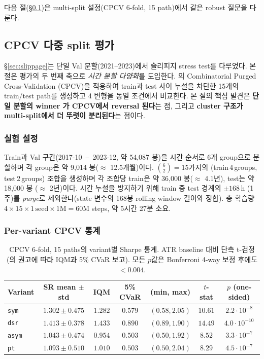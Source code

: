 \documentclass[11pt, a4paper]{article}
\begin{document}
다음 절(\S\ref{sec:cpcv})은 multi-split 설정(CPCV 6-fold, 15 path)에서 같은
robust 질문을 다룬다.

\subsection{CPCV 다중 split 평가}
\label{sec:cpcv}

\S\ref{sec:slippage}는 단일 Val 분할(2021--2023)에서 슬리피지 stress test를
다루었다. 본 절은 평가의 두 번째 축으로 \emph{시간 분할 다양화}를 도입한다.
\citet{lopezdeprado2018advances}의 Combinatorial Purged Cross-Validation
(CPCV)을 적용하여 train과 test 사이 누설을 차단한 15개의 train/test path를
생성하고 4 변형을 동일 조건에서 비교한다. 본 절의 핵심 발견은
\textbf{단일 분할의 winner 가 CPCV에서 reversal 된다}는 점, 그리고
\textbf{cluster 구조가 multi-split에서 더 뚜렷이 분리된다}는 점이다.

\subsubsection{실험 설정}
\label{sec:cpcv_setup}

Train과 Val 구간(2017-10 \,--\, 2023-12, 약 54{,}087 봉)을 시간 순서로 6개
group으로 분할하며 각 group은 약 9{,}014 봉($\approx$ 12.5개월)이다.
$\binom{6}{2} = 15$가지의 (train\,4\,groups, test\,2\,groups) 조합을 생성하며
각 조합당 train은 약 36{,}000 봉($\approx$ 4.1년), test는 약 18{,}000 봉
($\approx$ 2년)이다. 시간 누설을 방지하기 위해 train 중 test 경계의
$\pm 168\,\mathrm{h}$ (1주)를 \emph{purge}로 제외한다(state 변수의 168봉
rolling window 길이와 정합). 총 학습량 $4 \times 15 \times 1\,\mathrm{seed} \times
1\mathrm{M} = 60$M steps, 약 5시간 27분 소요.

\subsubsection{Per-variant CPCV 통계}
\label{sec:cpcv_per_variant}

\begin{table}[!htbp]
\centering
\small
\caption{CPCV 6-fold, 15 paths의 variant별 Sharpe 통계. ATR baseline 대비 단측
t-검정 (\citealt{henderson2018rlreproducibility}의 권고에 따라 IQM과 5\% CVaR
보고). 모든 $p$값은 Bonferroni 4-way 보정 후에도 $< 0.004$.}
\begin{tabular}{lcccccc}
\toprule
Variant & SR mean $\pm$ std & IQM & 5\% CVaR & (min, max) & $t$-stat & $p$ (one-sided) \\
\midrule
\texttt{sym}  & $1.302 \pm 0.475$ & $1.282$ & $0.579$ & $(0.58, 2.05)$ & $10.61$ & $2.2 \cdot 10^{-8}$ \\
\texttt{dsr}  & $\mathbf{1.413 \pm 0.378}$ & $\mathbf{1.433}$ & $\mathbf{0.890}$ & $(0.89, 1.90)$ & $\mathbf{14.49}$ & $4.0 \cdot 10^{-10}$ \\
\texttt{asym} & $1.043 \pm 0.474$ & $0.954$ & $0.503$ & $(0.50, 1.92)$ & $8.52$ & $3.3 \cdot 10^{-7}$ \\
\texttt{pt}   & $1.093 \pm 0.510$ & $1.010$ & $0.503$ & $(0.50, 2.04)$ & $8.29$ & $4.5 \cdot 10^{-7}$ \\
\bottomrule
\end{tabular}
\label{tab:cpcv_per_variant}
\end{table}
\end{document}
